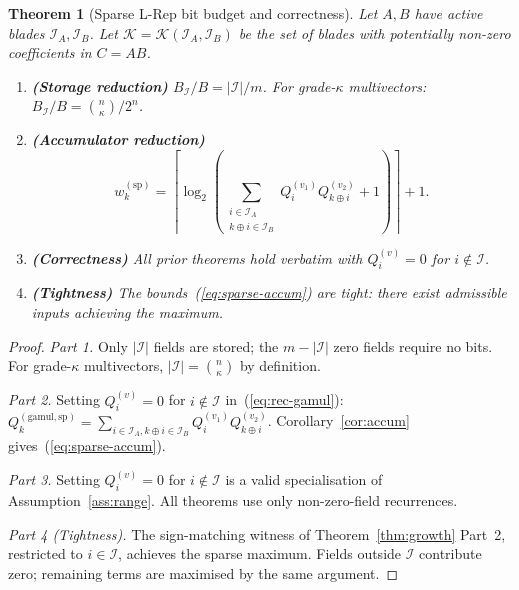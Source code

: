 \documentclass[11pt,a4paper]{article}
\theoremstyle{definition}
\theoremstyle{plain}
\newtheorem{theorem}{Theorem}[section]
\theoremstyle{remark}
\begin{document}
\begin{theorem}[Sparse L-Rep bit budget and correctness]
\label{thm:sparse}
Let $A,B$ have active blades $\mathcal{I}_A,\mathcal{I}_B$.
Let $\mathcal{K}=\mathcal{K}(\mathcal{I}_A,\mathcal{I}_B)$ be the set
of blades with potentially non-zero coefficients in $C=AB$.

\begin{enumerate}
  \item \textbf{(Storage reduction)}
        $B_{\mathcal{I}}/B=|\mathcal{I}|/m$.
        For grade-$\kappa$ multivectors:
        $B_{\mathcal{I}}/B=\binom{n}{\kappa}/2^n$.

  \item \textbf{(Accumulator reduction)}
        \begin{equation}\label{eq:sparse-accum}
          w_k^{(\mathrm{sp})}=\left\lceil\log_2\!\left(
            \sum_{\substack{i\in\mathcal{I}_A\\k\oplus i\in\mathcal{I}_B}}
            Q_i^{(v_1)}Q_{k\oplus i}^{(v_2)}+1\right)\right\rceil+1.
        \end{equation}

  \item \textbf{(Correctness)} All prior theorems hold verbatim with
        $Q_i^{(v)}=0$ for $i\notin\mathcal{I}$.

  \item \textbf{(Tightness)} The bounds~(\ref{eq:sparse-accum}) are
        tight: there exist admissible inputs achieving the maximum.
\end{enumerate}
\end{theorem}

\begin{proof}
\textit{Part 1.}
Only $|\mathcal{I}|$ fields are stored; the $m-|\mathcal{I}|$ zero fields
require no bits.
For grade-$\kappa$ multivectors, $|\mathcal{I}|=\binom{n}{\kappa}$ by
definition.

\textit{Part 2.}
Setting $Q_i^{(v)}=0$ for $i\notin\mathcal{I}$ in~(\ref{eq:rec-gamul}):
$Q_k^{(\mathrm{gamul,sp})}=\sum_{i\in\mathcal{I}_A,k\oplus i\in\mathcal{I}_B}
Q_i^{(v_1)}Q_{k\oplus i}^{(v_2)}$.
Corollary~\ref{cor:accum} gives~(\ref{eq:sparse-accum}).

\textit{Part 3.}
Setting $Q_i^{(v)}=0$ for $i\notin\mathcal{I}$ is a valid specialisation
of Assumption~\ref{ass:range}.
All theorems use only non-zero-field recurrences.

\textit{Part 4 (Tightness).}
The sign-matching witness of Theorem~\ref{thm:growth} Part~2,
restricted to $i\in\mathcal{I}$, achieves the sparse maximum.
Fields outside $\mathcal{I}$ contribute zero; remaining terms are
maximised by the same argument.
\end{proof}
\end{document}
